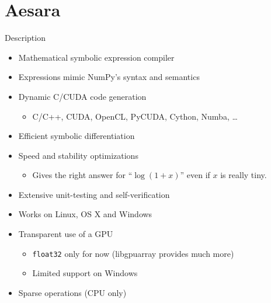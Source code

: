 \documentclass[utf8x,xcolor=pdftex,dvipsnames,table]{beamer}
\begin{document}
\section{Aesara}
\begin{frame}
  \tableofcontents[currentsection]
\end{frame}

\begin{frame}{Description}
  \begin{itemize}
    \item Mathematical symbolic expression compiler
    \item Expressions mimic NumPy's syntax and semantics
    \item Dynamic C/CUDA code generation
    \begin{itemize}
      \item C/C++, CUDA, OpenCL, PyCUDA, Cython, Numba, \ldots
    \end{itemize}
    \item Efficient symbolic differentiation
    \item Speed and stability optimizations
    \begin{itemize}
      \item Gives the right answer for ``$\log (1 + x)$'' even if $x$ is really tiny.
    \end{itemize}
    \item Extensive unit-testing and self-verification
    \item Works on Linux, OS X and Windows
    \item Transparent use of a GPU
    \begin{itemize}
      \item {\tt float32} only for now (libgpuarray provides much more)
      \item Limited support on Windows
    \end{itemize}

    \item Sparse operations (CPU only)
  \end{itemize}
\end{frame}
\end{document}
